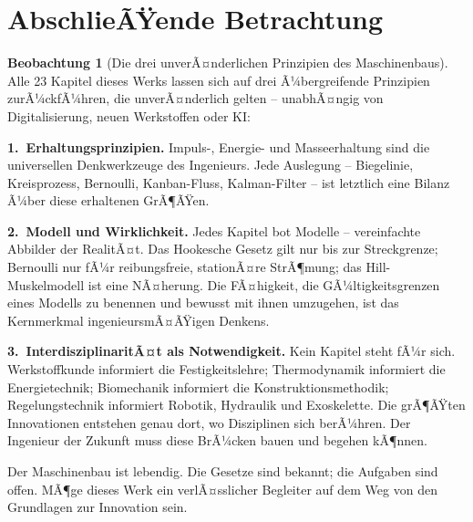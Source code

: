 ﻿\documentclass[a4paper,12pt]{report}
\theoremstyle{definition}
\newtheorem{beobachtung}{Beobachtung}
\begin{document}
\section{AbschlieÃŸende Betrachtung}

\begin{beobachtung}[Die drei unverÃ¤nderlichen Prinzipien des Maschinenbaus]
Alle 23 Kapitel dieses Werks lassen sich auf drei Ã¼bergreifende
Prinzipien zurÃ¼ckfÃ¼hren, die unverÃ¤nderlich gelten -- unabhÃ¤ngig von
Digitalisierung, neuen Werkstoffen oder KI:

\medskip
\noindent\textbf{1.~Erhaltungsprinzipien.}
Impuls-, Energie- und Masseerhaltung sind die universellen
Denkwerkzeuge des Ingenieurs. Jede Auslegung -- Biegelinie, Kreisprozess,
Bernoulli, Kanban-Fluss, Kalman-Filter -- ist letztlich eine Bilanz
Ã¼ber diese erhaltenen GrÃ¶ÃŸen.

\medskip
\noindent\textbf{2.~Modell und Wirklichkeit.}
Jedes Kapitel bot Modelle -- vereinfachte Abbilder der RealitÃ¤t.
Das Hookesche Gesetz gilt nur bis zur Streckgrenze;
Bernoulli nur fÃ¼r reibungsfreie, stationÃ¤re StrÃ¶mung;
das Hill-Muskelmodell ist eine NÃ¤herung.
Die FÃ¤higkeit, die GÃ¼ltigkeitsgrenzen eines Modells zu benennen
und bewusst mit ihnen umzugehen, ist das Kernmerkmal ingenieursmÃ¤ÃŸigen Denkens.

\medskip
\noindent\textbf{3.~InterdisziplinaritÃ¤t als Notwendigkeit.}
Kein Kapitel steht fÃ¼r sich. Werkstoffkunde informiert
die Festigkeitslehre; Thermodynamik informiert die Energietechnik;
Biomechanik informiert die Konstruktionsmethodik; Regelungstechnik
informiert Robotik, Hydraulik und Exoskelette. Die grÃ¶ÃŸten Innovationen
entstehen genau dort, wo Disziplinen sich berÃ¼hren.
Der Ingenieur der Zukunft muss diese BrÃ¼cken bauen und begehen kÃ¶nnen.

\medskip
Der Maschinenbau ist lebendig. Die Gesetze sind bekannt;
die Aufgaben sind offen. MÃ¶ge dieses Werk ein verlÃ¤sslicher
Begleiter auf dem Weg von den Grundlagen zur Innovation sein.
\end{beobachtung}
\end{document}
